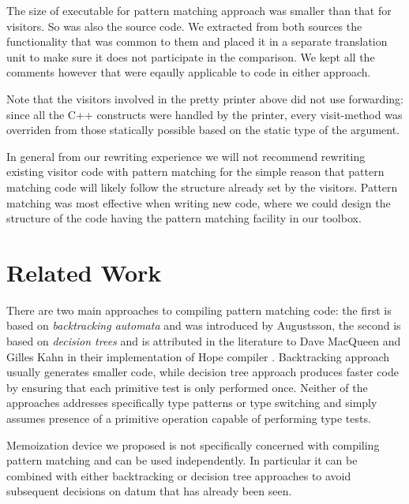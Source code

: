 \documentclass[preprint]{sigplanconf}
\begin{document}
The size of executable for pattern matching approach was smaller than that for 
visitors. So was also the source code. We extracted from both sources the 
functionality that was common to them and placed it in a separate translation 
unit to make sure it does not participate in the comparison. We kept all the 
comments however that were eqaully applicable to code in either approach.

Note that the visitors involved in the pretty printer above did not use 
forwarding: since all the C++ constructs were handled by the printer, every 
visit-method was overriden from those statically possible based on the static 
type of the argument.



In general from our rewriting experience we will not recommend rewriting 
existing visitor code with pattern matching for the simple reason that pattern 
matching code will likely follow the structure already set by the visitors. 
Pattern matching was most effective when writing new code, where we could design 
the structure of the code having the pattern matching facility in our toolbox.

\section{Related Work} %
\label{sec:rw}

There are two main approaches to compiling pattern matching code: the first is 
based on \emph{backtracking automata} and was introduced by Augustsson\cite{}, 
the second is based on \emph{decision trees} and is attributed in the literature 
to Dave MacQueen and Gilles Kahn in their implementation of Hope compiler \cite{}.
Backtracking approach usually generates smaller code, while decision tree 
approach produces faster code by ensuring that each primitive test is only 
performed once. Neither of the approaches addresses specifically type patterns 
or type switching and simply assumes presence of a primitive operation capable 
of performing type tests.

Memoization device we proposed is not specifically concerned with compiling 
pattern matching and can be used independently. In particular it can be combined 
with either backtracking or decision tree approaches to avoid subsequent 
decisions on datum that has already been seen.
\end{document}
